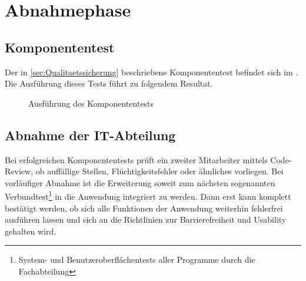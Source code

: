 \section{Abnahmephase} 
\label{sec:Abnahmephase}

\subsection{Komponententest}

Der in \ref{sec:Qualitaetssicherung} beschriebene Komponententest befindet sich im .
Die Ausführung dieses Tests führt zu folgendem Resultat.

\begin{figure}[h]
	\centering
	\caption{Ausführung des Komponententests}
\end{figure}

\subsection{Abnahme der IT-Abteilung}

Bei erfolgreichen Komponententests prüft ein zweiter Mitarbeiter mittels Code-Review, ob auffällige Stellen, Flüchtigkeitsfehler oder ähnliches vorliegen. Bei vorläufiger Abnahme ist die Erweiterung soweit zum nächsten sogenannten Verbundtest\footnote{System- und Benutzeroberflächentests aller Programme durch die Fachabteilung} in die Anwendung integriert zu werden. Dann erst kann komplett bestätigt werden, ob sich alle Funktionen der Anwendung weiterhin fehlerfrei ausführen lassen und sich an die Richtlinien zur Barrierefreiheit und Usability gehalten wird.


